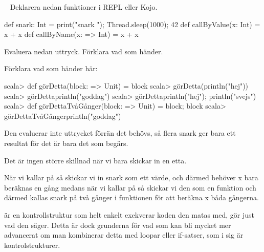 \QUESTBEGIN

\Task  \what~  Deklarera nedan funktioner i REPL eller Kojo.

\begin{Code}
def snark: Int = {print("snark "); Thread.sleep(1000); 42}
def callByValue(x: Int) = x + x
def callByName(x: => Int) = x + x
\end{Code}

Evaluera nedan uttryck. Förklara vad som händer.

\Subtask {}

\Subtask {}

\Subtask {}

\Subtask {}

\Subtask {}

\Subtask {}


\Subtask Förklara vad som händer här:
\begin{REPL}
scala> def görDetta(block: => Unit) = block
scala> görDetta(println("hej"))
scala> görDetta{println("goddag")}
scala> görDetta{println("hej"); println("svejs")}
scala> def görDettaTvåGånger(block: => Unit) = {block; block}
scala> görDettaTvåGånger{println("goddag")}
\end{REPL}


\SOLUTION


\TaskSolved \what


\SubtaskSolved  {}

\SubtaskSolved  {}

Den evaluerar inte uttrycket förrän det behövs, så flera snark ger bara ett resultat för det är bara det som begärs.

\SubtaskSolved  {}

\SubtaskSolved  {}

Det är ingen större skillnad när vi bara skickar in en etta.

\SubtaskSolved  {}

\SubtaskSolved  När vi kallar på  så skickar vi in snark som ett värde, och därmed behöver x bara beräknas en gång medans när vi kallar på  så skickar vi den som en funktion och därmed kallas snark på två gånger i funktionen för att beräkna x båda gångerna.


\SubtaskSolved  {} är en kontrollstruktur som helt enkelt exekverar koden den matas med,  gör just vad den säger. Detta är dock grunderna för vad som kan bli mycket mer advancerat om man kombinerar detta med loopar eller if-satser, som i sig är kontrolstrukturer.



